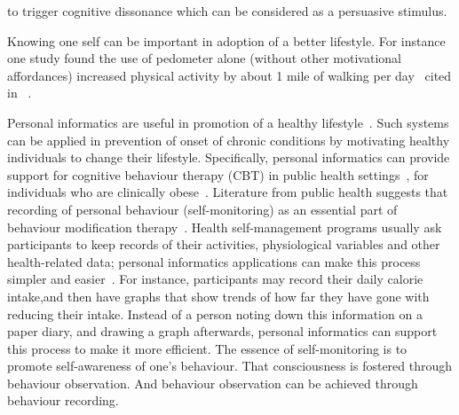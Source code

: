 to trigger cognitive dissonance which can be considered as a persuasive stimulus. 

Knowing one self can be important in adoption of a better lifestyle. For instance one study found the use of pedometer alone (without other motivational affordances) increased physical activity by about 1 mile of walking per day~\citep{bravata2007using} cited in ~\cite{albaina2009flowie}. 

Personal informatics are useful in promotion of a healthy lifestyle~\citep{korhonen2010personal}. Such systems can be applied in prevention of onset of chronic conditions by motivating healthy individuals to change their lifestyle. Specifically, personal informatics can provide support for cognitive behaviour therapy (CBT) in public health settings~\citep{mattila2008mobile}, for individuals who are clinically obese~\citep{nih2000practical}. Literature from public health suggests that recording of personal behaviour (self-monitoring) as an essential part of behaviour modification therapy~\citep{nih2000practical}. Health self-management programs usually ask participants to keep records of their activities, physiological variables and other health-related data; personal informatics applications can make this process simpler and easier~\citep{medynskiy2010salud}. For instance, participants may record their daily calorie intake,and then have graphs that show trends of how far they have gone with reducing their intake. Instead of a person noting down this information on a paper diary, and drawing a graph afterwards, personal informatics can support this process to make it more efficient. The essence of self-monitoring is to promote self-awareness of one’s behaviour. That consciousness is fostered through behaviour observation. And behaviour observation can be achieved through behaviour recording.  

